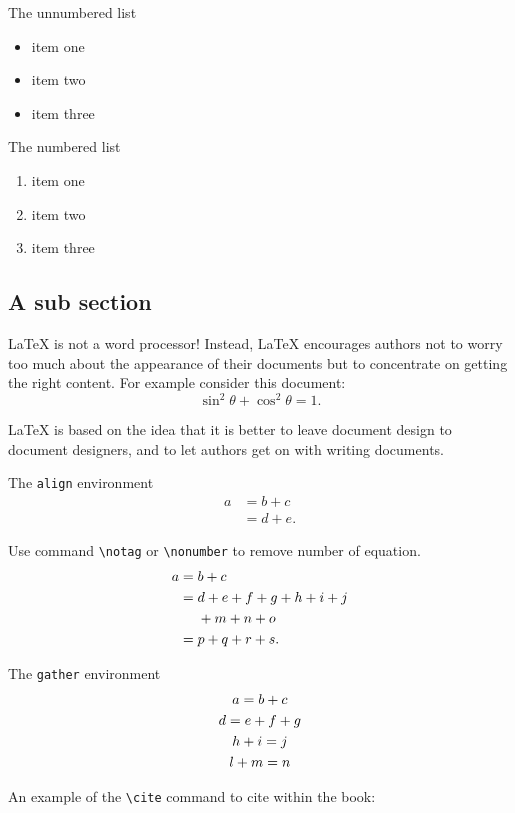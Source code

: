 \documentclass[openany,twoside,12pt]{book}
\theoremstyle{plain}
\numberwithin{equation}{chapter}
\numberwithin{figure}{chapter}
\numberwithin{table}{chapter}
\begin{document}
The unnumbered list
\begin{itemize}
  \item item one
  \item item two
  \item item three
\end{itemize}

The numbered list
\begin{enumerate}
  \item item one
  \item item two
  \item item three
\end{enumerate}

\subsection{A sub section}
LaTeX is not a word processor! Instead, LaTeX encourages authors not to worry too much about the appearance of their documents but to concentrate on getting the right content. For example consider this document:
\begin{equation}\label{eq:trifun}
\sin^2{\theta}+\cos^2{\theta}=1.
\end{equation}

LaTeX is based on the idea that it is better to leave document design to document designers, and to let authors get on with writing documents.

The \texttt{align} environment
\begin{align}
a & = b + c \\
& = d + e.
\end{align}

Use command \verb|\notag| or \verb|\nonumber| to remove number of equation.
\begin{align}
a ={} & b + c \\
={} & d + e + f + g + h + i + j \notag \\
& + m + n + o \\
={} & p + q + r + s.
\end{align}

The \texttt{gather} environment
\begin{gather}
a = b + c \\
d = e + f + g \notag \\
h + i = j \\
l + m = n
\end{gather}

An example of the \verb|\cite| command to cite within the book:
\end{document}
